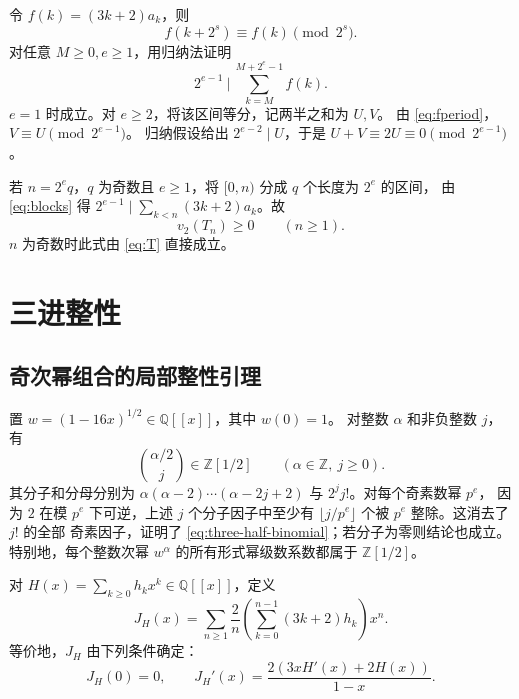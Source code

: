 \documentclass[a4paper,11pt]{article}
\numberwithin{equation}{section}
\theoremstyle{chinese}
\newcommand{\Q}{\mathbb Q}
\begin{document}
令 $f(k)=(3k+2)a_k$，则
\begin{equation}\label{eq:fperiod}
f(k+2^s)\equiv f(k)\pmod{2^s}.
\end{equation}
对任意 $M\ge0,e\ge1$，用归纳法证明
\begin{equation}\label{eq:blocks}
2^{e-1}\ \bigg|\ \sum_{k=M}^{M+2^e-1}f(k).
\end{equation}
$e=1$ 时成立。对 $e\ge2$，将该区间等分，记两半之和为 $U,V$。
由 \eqref{eq:fperiod}，$V\equiv U\pmod{2^{e-1}}$。
归纳假设给出 $2^{e-2}\mid U$，于是 $U+V\equiv2U\equiv0\pmod{2^{e-1}}$。

若 $n=2^eq$，$q$ 为奇数且 $e\ge1$，将 $[0,n)$ 分成 $q$ 个长度为 $2^e$ 的区间，
由 \eqref{eq:blocks} 得 $2^{e-1}\mid\sum_{k<n}(3k+2)a_k$。故
\begin{equation}\label{eq:T2}
v_2(T_n)\ge0\qquad(n\ge1).
\end{equation}
$n$ 为奇数时此式由 \eqref{eq:T} 直接成立。

\section{三进整性}\label{sec:three-finite}
\subsection{奇次幂组合的局部整性引理}
置 $w=(1-16x)^{1/2}\in\Q[[x]]$，其中 $w(0)=1$。
对整数 $\alpha$ 和非负整数 $j$，有
\begin{equation}
\binom{\alpha/2}{j}\in\mathbb Z[1/2]
\qquad(\alpha\in\mathbb Z,\ j\ge0).
\label{eq:three-half-binomial}
\end{equation}
其分子和分母分别为
\(\alpha(\alpha-2)\cdots(\alpha-2j+2)\) 与 \(2^j j!\)。对每个奇素数幂 \(p^e\)，
因为 \(2\) 在模 \(p^e\) 下可逆，上述 \(j\) 个分子因子中至少有
\(\lfloor j/p^e\rfloor\) 个被 \(p^e\) 整除。这消去了 \(j!\) 的全部
奇素因子，证明了 \eqref{eq:three-half-binomial}；若分子为零则结论也成立。
特别地，每个整数次幂 \(w^\alpha\) 的所有形式幂级数系数都属于
\(\mathbb Z[1/2]\)。

对 \(H(x)=\sum_{k\ge0}h_kx^k\in\mathbb Q[[x]]\)，定义
\[
J_H(x)=\sum_{n\ge1}\frac{2}{n}
\left(\sum_{k=0}^{n-1}(3k+2)h_k\right)x^n.
\]
等价地，$J_H$ 由下列条件确定：
\begin{equation}
J_H(0)=0,
\qquad
J_H'(x)=\frac{2(3xH'(x)+2H(x))}{1-x}.
\label{eq:three-primitive-definition}
\end{equation}
\end{document}
